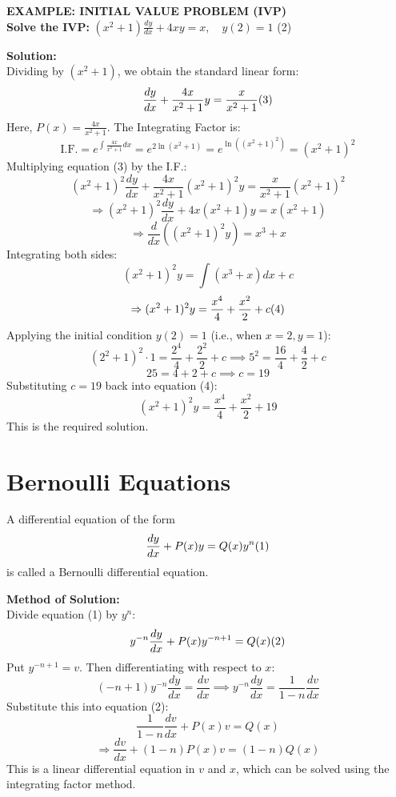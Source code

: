 \documentclass[11pt,a4paper]{article}
\begin{document}
\begin{tcolorbox}[colback=LightBg, colframe=BorderGray, arc=4mm]
    {\small\textbf{\textcolor{AccentBlue}{EXAMPLE: INITIAL VALUE PROBLEM (IVP)}}}
    \vspace{0.2cm}\\
    \textbf{Solve the IVP:} $\displaystyle (x^2+1)\frac{dy}{dx} + 4xy = x, \quad y(2)=1$ \hfill (2)
    
    \vspace{0.2cm}
    \textbf{Solution:} \\
    Dividing by $(x^2+1)$, we obtain the standard linear form:
    \[ \frac{dy}{dx} + \frac{4x}{x^2+1}y = \frac{x}{x^2+1} \hfill (3) \]
    Here, $P(x) = \frac{4x}{x^2+1}$. The Integrating Factor is:
    \[ \text{I.F.} = e^{\int \frac{4x}{x^2+1} dx} = e^{2\ln(x^2+1)} = e^{\ln((x^2+1)^2)} = (x^2+1)^2 \]
    Multiplying equation (3) by the I.F.:
    \[ (x^2+1)^2 \frac{dy}{dx} + \frac{4x}{x^2+1}(x^2+1)^2 y = \frac{x}{x^2+1}(x^2+1)^2 \]
    \[ \Rightarrow (x^2+1)^2 \frac{dy}{dx} + 4x(x^2+1)y = x(x^2+1) \]
    \[ \Rightarrow \frac{d}{dx} \left( (x^2+1)^2 y \right) = x^3 + x \]
    Integrating both sides:
    \[ (x^2+1)^2 y = \int (x^3 + x) dx + c \]
    \[ \Rightarrow (x^2+1)^2 y = \frac{x^4}{4} + \frac{x^2}{2} + c \hfill (4) \]
    Applying the initial condition $y(2)=1$ (i.e., when $x=2, y=1$):
    \[ (2^2+1)^2 \cdot 1 = \frac{2^4}{4} + \frac{2^2}{2} + c \implies 5^2 = \frac{16}{4} + \frac{4}{2} + c \]
    \[ 25 = 4 + 2 + c \implies c = 19 \]
    Substituting $c=19$ back into equation (4):
    \[ (x^2+1)^2 y = \frac{x^4}{4} + \frac{x^2}{2} + 19 \]
    This is the required solution.
\end{tcolorbox}

\section{Bernoulli Equations}
A differential equation of the form
\[ \frac{dy}{dx} + P(x)y = Q(x)y^n \hfill (1) \]
is called a Bernoulli differential equation.

\vspace{0.2cm}
\noindent\textbf{\textcolor{DeepNavy}{Method of Solution:}} \\
Divide equation (1) by $y^n$:
\[ y^{-n}\frac{dy}{dx} + P(x)y^{-n+1} = Q(x) \hfill (2) \]
Put $y^{-n+1} = v$. Then differentiating with respect to $x$:
\[ (-n+1)y^{-n}\frac{dy}{dx} = \frac{dv}{dx} \implies y^{-n}\frac{dy}{dx} = \frac{1}{1-n}\frac{dv}{dx} \]
Substitute this into equation (2):
\[ \frac{1}{1-n}\frac{dv}{dx} + P(x)v = Q(x) \]
\[ \Rightarrow \frac{dv}{dx} + (1-n)P(x)v = (1-n)Q(x) \]
This is a linear differential equation in $v$ and $x$, which can be solved using the integrating factor method.
\end{document}
